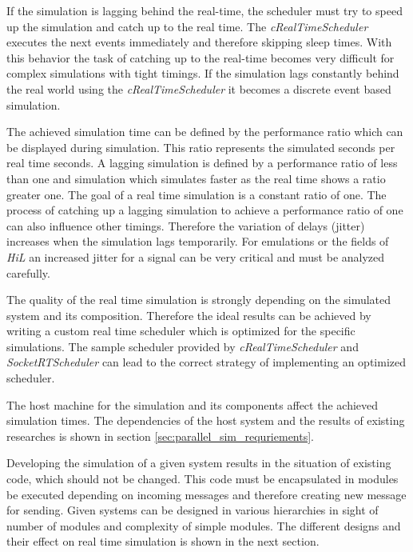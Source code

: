 If the simulation is lagging behind the real-time, the scheduler must try to speed up the simulation and catch up to the real time.
The \emph{cRealTimeScheduler} executes the next events immediately and therefore skipping sleep times.
With this behavior the task of catching up to the real-time becomes very difficult for complex simulations with tight timings.
If the simulation lags constantly behind the real world using the \emph{cRealTimeScheduler} it becomes a discrete event based simulation.

The achieved simulation time can be defined by the performance ratio which can be displayed during simulation.
This ratio represents the simulated seconds per real time seconds.
A lagging simulation is defined by a performance ratio of less than one and simulation which simulates faster as the real time shows a ratio greater one.
The goal of a real time simulation is a constant ratio of one.
The process of catching up a lagging simulation to achieve a performance ratio of one can also influence other timings.
Therefore the variation of delays (jitter) increases when the simulation lags temporarily.
For emulations or the fields of \emph{HiL} an increased jitter for a signal can be very critical and must be analyzed carefully.

The quality of the real time simulation is strongly depending on the simulated system and its composition.
Therefore the ideal results can be achieved by writing a custom real time scheduler which is optimized for the specific simulations.
The sample scheduler provided by \emph{cRealTimeScheduler} and \emph{SocketRTScheduler} can lead to the correct strategy of implementing an optimized scheduler.

The host machine for the simulation and its components affect the achieved simulation times.
The dependencies of the host system and the results of existing researches is shown in section \ref{sec:parallel_sim_requriements}.

Developing the simulation of a given system results in the situation of existing code, which should not be changed.
This code must be encapsulated in modules be executed depending on incoming messages and therefore creating new message for sending.
Given systems can be designed in various hierarchies in sight of number of modules and complexity of simple modules.
The different designs and their effect on real time simulation is shown in the next section.

